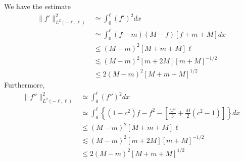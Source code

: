 \documentclass[12pt,reqno]{amsart}
\numberwithin{equation}{section}  %
\begin{document}
%
%
We have the estimate
%
%
\begin{equation*}
\begin{split}
  \| f' \|^{2}_{L^{2}(-\ell, \ell)}
  & \simeq \int_{0}^{\ell} (f')^{2} dx
  \\
  & \simeq \int_{0}^{\ell} (f-m)(M-f)\left[ f +m + M
  \right]dx
  \\
  & \le (M-m)^{2} \left[ M  +m + M \right] \ell
  \\
  & \lesssim (M-m)^{2} \left[ m + 2M   \right]
  \left[ m + M \right]^{-1/2}
  \\
  & \le 2 (M-m)^{2}\left[ M  +m + M \right]^{1/2}
\end{split}
\end{equation*}
%
%
Furthermore,
\begin{equation*}
\begin{split}
  \| f'' \|^{2}_{L^{2}(-\ell, \ell)}
  & \simeq \int_{0}^{\ell} (f'')^{2} dx
  \\
  & \simeq \int_{0}^{\ell}
  \left\{ (1-c^{2})f - f^{2} - \left [\frac{M^{2}}{3} + \frac{M}{2}(c^{2}-1)
  \right] \right\}dx
  \\
  & \le (M-m)^{2} \left[ M  +m + M \right] \ell
  \\
  & \lesssim (M-m)^{2} \left[ m + 2M   \right]
  \left[ m + M \right]^{-1/2}
  \\
  & \le 2 (M-m)^{2}\left[ M  +m + M \right]^{1/2}
\end{split}
\end{equation*}


%
%
%
%
%
%
%
\end{document}
